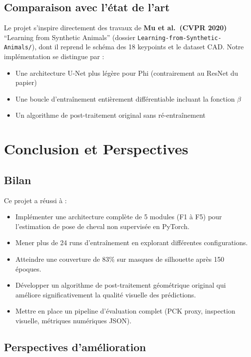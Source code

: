 \documentclass[12pt,a4paper]{article}
\begin{document}
\subsection{Comparaison avec l'état de l'art}

Le projet s'inspire directement des travaux de \textbf{Mu et al.\ (CVPR 2020)}
``Learning from Synthetic Animals'' (dossier \texttt{Learning-from-Synthetic-Animals/}),
dont il reprend le schéma des 18 keypoints et le dataset CAD. Notre implémentation
se distingue par :
\begin{itemize}
  \item Une architecture U-Net plus légère pour Phi (contrairement au ResNet du papier)
  \item Une boucle d'entraînement entièrement différentiable incluant la fonction $\beta$
  \item Un algorithme de post-traitement original sans ré-entraînement
\end{itemize}

\section{Conclusion et Perspectives}

\subsection{Bilan}

Ce projet a réussi à :
\begin{itemize}
  \item Implémenter une architecture complète de 5 modules (F1 à F5) pour
        l'estimation de pose de cheval non supervisée en PyTorch.
  \item Mener plus de 24 runs d'entraînement en explorant différentes configurations.
  \item Atteindre une couverture de 83\% sur masques de silhouette après 150 époques.
  \item Développer un algorithme de post-traitement géométrique original
        qui améliore significativement la qualité visuelle des prédictions.
  \item Mettre en place un pipeline d'évaluation complet (PCK proxy, inspection
        visuelle, métriques numériques JSON).
\end{itemize}

\subsection{Perspectives d'amélioration}
\end{document}
